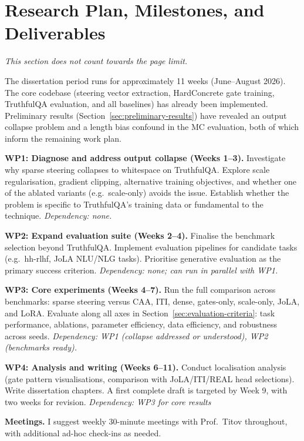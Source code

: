 \section{Research Plan, Milestones, and Deliverables}
\textit{This section does not count towards the page limit.}

The dissertation period runs for approximately 11 weeks (June--August 2026).
The core codebase (steering vector extraction, HardConcrete gate training, TruthfulQA evaluation, and all baselines) has already been implemented.
Preliminary results (Section~\ref{sec:preliminary-results}) have revealed an output collapse problem and a length bias confound in the MC evaluation, both of which inform the remaining work plan.

\textbf{WP1: Diagnose and address output collapse (Weeks 1--3).}
Investigate why sparse steering collapses to whitespace on TruthfulQA. Explore scale regularisation, gradient clipping, alternative training objectives, and whether one of the ablated variants (e.g.\ scale-only) avoids the issue. Establish whether the problem is specific to TruthfulQA's training data or fundamental to the technique.
\emph{Dependency: none.}

\textbf{WP2: Expand evaluation suite (Weeks 2--4).}
Finalise the benchmark selection beyond TruthfulQA. Implement evaluation pipelines for candidate tasks (e.g.\ hh-rlhf, JoLA NLU/NLG tasks). Prioritise generative evaluation as the primary success criterion.
\emph{Dependency: none; can run in parallel with WP1.}

\textbf{WP3: Core experiments (Weeks 4--7).}
Run the full comparison across benchmarks: sparse steering versus CAA, ITI, dense, gates-only, scale-only, JoLA, and LoRA. Evaluate along all axes in Section~\ref{sec:evaluation-criteria}: task performance, ablations, parameter efficiency, data efficiency, and robustness across seeds.
\emph{Dependency: WP1 (collapse addressed or understood), WP2 (benchmarks ready).}

\textbf{WP4: Analysis and writing (Weeks 6--11).}
Conduct localisation analysis (gate pattern visualisations, comparison with JoLA/ITI/REAL head selections). Write dissertation chapters. A first complete draft is targeted by Week 9, with two weeks for revision.
\emph{Dependency: WP3 for core results}

\textbf{Meetings.} I suggest weekly 30-minute meetings with Prof.~Titov throughout, with additional ad-hoc check-ins as needed.


